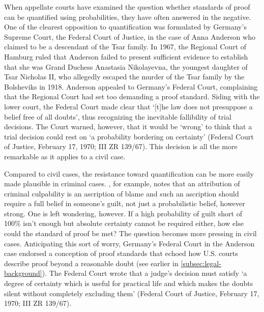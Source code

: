 \documentclass{article}
\begin{document}
When appellate courts have examined the question whether standards of proof can be quantified using probabilities, they have often answered in the negative. One of the clearest opposition to quantification was formulated by Germany's Supreme Court, the Federal Court of Justice, in the case of Anna Anderson who claimed to be a descendant of the Tsar family. In 1967, the Regional Court of Hamburg ruled that Anderson failed to present sufficient evidence to establish that she was Grand Duchess Anastasia Nikolayevna, the youngest daughter of Tsar Nicholas II, who allegedly escaped the murder of the Tsar family by the Bolsheviks in 1918. %
Anderson appealed to Germany's Federal Court, complaining that the Regional Court had set too demanding a proof standard. Siding with the lower court, 
the Federal Court made clear that `[t]he law does not presuppose a belief free of all doubts', thus recognizing the inevitable fallibility of trial decisions. The Court warned, however, that it would be `wrong' to think that a trial decision could rest on `a probability bordering on certainty' (Federal Court of Justice, February 17, 1970; III ZR 139/67). 
This decision is all the more remarkable as it applies to a civil case. 

%
%
Compared to civil cases, the resistance toward quantification  can be more easily made plausible in criminal cases. 
 \cite{buchak2014belief}, for example, 
notes that an attribution of criminal culpability is an ascription of blame and such an ascription should require a full belief in someone's guilt, not just a probabilistic belief, however strong.
One is left wondering, however. If a high probability of guilt short of 100\% isn't enough but absolute certainty cannot be required either, how else could the standard of proof be met? The question becomes more pressing in civil cases. Anticipating this sort of worry, Germany's Federal Court in the Anderson case endorsed a conception of proof standards  that echoed how U.S. courts describe proof beyond a reasonable doubt (see earlier in \ref{subsec:legal-background}). The Federal Court wrote that a judge's decision must satisfy
`a degree of certainty which is useful for practical life and which makes the doubts silent without completely excluding them' (Federal Court of Justice, February 17, 1970; III ZR 139/67).  
\end{document}
